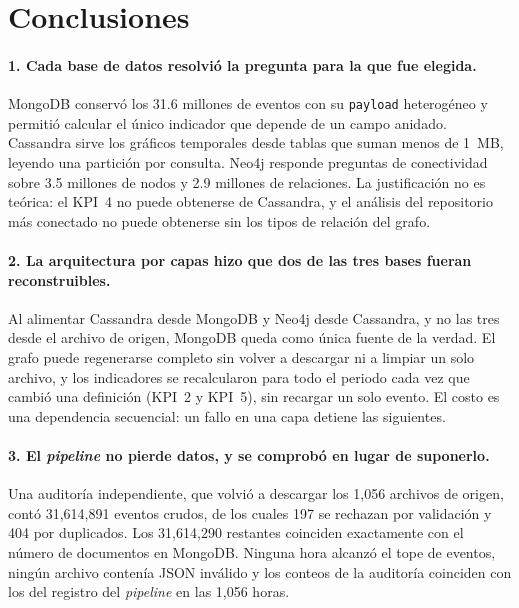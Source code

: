 \section{Conclusiones}

\paragraph{1. Cada base de datos resolvió la pregunta para la que fue elegida.} MongoDB conservó los 31.6 millones de eventos con su \texttt{payload} heterogéneo y permitió calcular el único indicador que depende de un campo anidado. Cassandra sirve los gráficos temporales desde tablas que suman menos de 1~MB, leyendo una partición por consulta. Neo4j responde preguntas de conectividad sobre 3.5 millones de nodos y 2.9 millones de relaciones. La justificación no es teórica: el KPI~4 no puede obtenerse de Cassandra, y el análisis del repositorio más conectado no puede obtenerse sin los tipos de relación del grafo.

\paragraph{2. La arquitectura por capas hizo que dos de las tres bases fueran reconstruibles.} Al alimentar Cassandra desde MongoDB y Neo4j desde Cassandra, y no las tres desde el archivo de origen, MongoDB queda como única fuente de la verdad. El grafo puede regenerarse completo sin volver a descargar ni a limpiar un solo archivo, y los indicadores se recalcularon para todo el periodo cada vez que cambió una definición (KPI~2 y KPI~5), sin recargar un solo evento. El costo es una dependencia secuencial: un fallo en una capa detiene las siguientes.

\paragraph{3. El \textit{pipeline} no pierde datos, y se comprobó en lugar de suponerlo.} Una auditoría independiente, que volvió a descargar los 1,056 archivos de origen, contó 31,614,891 eventos crudos, de los cuales 197 se rechazan por validación y 404 por duplicados. Los 31,614,290 restantes coinciden exactamente con el número de documentos en MongoDB. Ninguna hora alcanzó el tope de eventos, ningún archivo contenía JSON inválido y los conteos de la auditoría coinciden con los del registro del \textit{pipeline} en las 1,056 horas.

